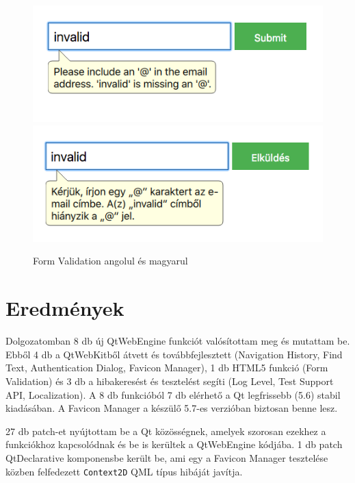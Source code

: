 \documentclass[12pt]{report}
\begin{document}
\begin{figure}[H]
    \centering
    \includegraphics[scale=0.6]{validation-message-english}
    \includegraphics[scale=0.6]{validation-message-magyar}
    \caption{
        \label{fig:validation-message-localization}
        Form Validation angolul és magyarul
    }
\end{figure}


\chapter*{Eredmények}

\enlargethispage{\baselineskip}

Dolgozatomban 8 db új QtWebEngine funkciót valósítottam meg és mutattam be. Ebből 4 db a
QtWebKitből átvett és továbbfejlesztett (Navigation History, Find Text, Authentication
Dialog, Favicon Manager), 1 db HTML5 funkció (Form Validation) és 3 db a hibakeresést és
tesztelést segíti (Log Level, Test Support API, Localization). A 8 db funkcióból 7 db
elérhető a Qt legfrissebb (5.6) stabil kiadásában. A Favicon Manager a készülő 5.7-es
verzióban biztosan benne lesz.

27 db patch-et nyújtottam be a Qt közösségnek, amelyek szorosan ezekhez a funkciókhoz
kapcsolódnak és be is kerültek a QtWebEngine kódjába. 1 db patch QtDeclarative komponensbe
került be, ami egy a Favicon Manager tesztelése közben felfedezett \texttt{Context2D}
QML típus hibáját javítja.
\end{document}
